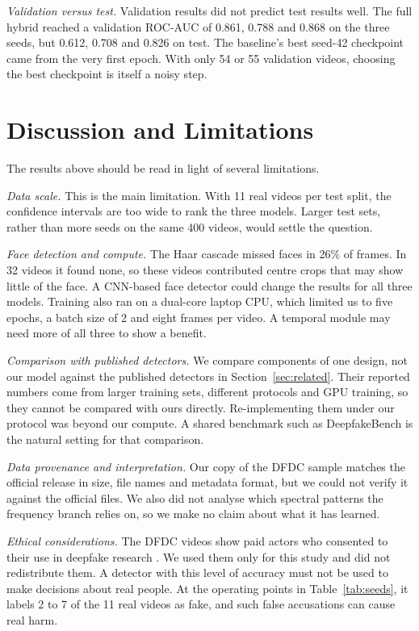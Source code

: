 \documentclass[conference]{IEEEtran}
\begin{document}
\textit{Validation versus test.} Validation results did not predict test
results well. The full hybrid reached a validation ROC-AUC of 0.861, 0.788
and 0.868 on the three seeds, but 0.612, 0.708 and 0.826 on test. The
baseline's best seed-42 checkpoint came from the very first epoch. With only
54 or 55 validation videos, choosing the best checkpoint is itself a noisy
step.

\section{Discussion and Limitations}

The results above should be read in light of several limitations.

\textit{Data scale.} This is the main limitation. With 11 real videos per
test split, the confidence intervals are too wide to rank the three models.
Larger test sets, rather than more seeds on the same 400 videos, would settle
the question.

\textit{Face detection and compute.} The Haar cascade missed faces in 26\% of
frames. In 32 videos it found none, so these videos contributed centre crops
that may show little of the face. A CNN-based face detector could change the
results for all three models. Training also ran on a dual-core laptop CPU,
which limited us to five epochs, a batch size of 2 and eight frames per
video. A temporal module may need more of all three to show a benefit.

\textit{Comparison with published detectors.} We compare components of one
design, not our model against the published detectors in
Section~\ref{sec:related}. Their reported numbers come from larger training
sets, different protocols and GPU training, so they cannot be compared with
ours directly. Re-implementing them under our protocol was beyond our
compute. A shared benchmark such as DeepfakeBench \cite{yan2023deepfakebench}
is the natural setting for that comparison.

\textit{Data provenance and interpretation.} Our copy of the DFDC sample
matches the official release in size, file names and metadata format, but we
could not verify it against the official files. We also did not analyse which
spectral patterns the frequency branch relies on, so we make no claim about
what it has learned.

\textit{Ethical considerations.} The DFDC videos show paid actors who
consented to their use in deepfake research \cite{dolhansky2020dfdc}. We used
them only for this study and did not redistribute them. A detector with this
level of accuracy must not be used to make decisions about real people. At
the operating points in Table~\ref{tab:seeds}, it labels 2 to 7 of the 11
real videos as fake, and such false accusations can cause real harm.
\end{document}
